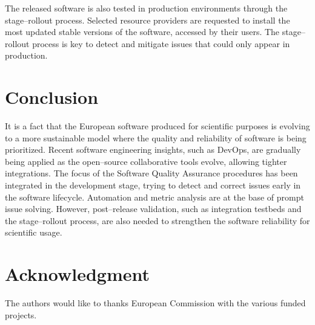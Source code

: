\documentclass[journal]{IEEEtran}
\begin{document}
The released software is also tested in production environments through the stage--rollout process. Selected resource providers are requested to install the most updated stable versions of the software, accessed by their users. The stage--rollout process is key to detect and mitigate issues that could only appear in production.

\section{Conclusion}

It is a fact that the European software produced for scientific purposes is evolving to a more sustainable model where the quality and reliability of software is being prioritized. Recent software engineering insights, such as DevOps, are gradually being applied as the open--source collaborative tools evolve, allowing tighter integrations. The focus of the Software Quality Assurance procedures has been integrated in the development stage, trying to detect and correct issues early in the software lifecycle. Automation and metric analysis are at the base of prompt issue solving. However, post--release validation, such as integration testbeds and the stage--rollout process, are also needed to strengthen the software reliability for scientific usage.


\section*{Acknowledgment}
The authors would like to thanks European Commission with the various funded projects.


\end{document}
